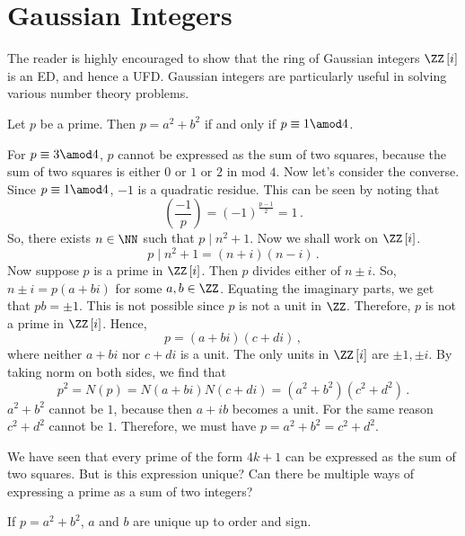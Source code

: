 \documentclass[11pt]{scrartcl}
\begin{document}
\section{Gaussian Integers}
The reader is highly encouraged to show that the ring of Gaussian integers \(\ZZ \left[i\right] \) is an ED, and hence a UFD. Gaussian integers are particularly useful in solving various number theory problems.
\begin{exercise}
Let \(p\) be a prime. Then \(p = a^2+b^2\) if and only if \(p \equiv 1 \amod 4\).
\end{exercise}
\begin{soln}
For \(p\equiv 3 \amod 4\), \(p\) cannot be expressed as the sum of two squares, because the sum of two squares is either \(0\) or \(1\) or \(2\) in mod \(4\). Now let's consider the converse. Since \(p \equiv 1 \amod 4\), \(-1\) is a quadratic residue. This can be seen by noting that
\[ \left(\frac{-1}{p}\right) = \left(-1\right) ^{\frac{p-1}{2}} = 1 \,. \]
So, there exists \(n \in \NN\) such that \(p \mid n^2 +1\). Now we shall work on \(\ZZ \left[i\right] \).
\[ p \mid n^2 + 1 = \left(n+i\right) \left(n-i\right) \,. \]
Now suppose \(p\) is a prime in \(\ZZ \left[i\right] \). Then \(p\) divides either of \(n \pm i\). So, \(n \pm i = p \left(a+bi\right) \) for some \(a,b \in \ZZ\). Equating the imaginary parts, we get that \(pb = \pm 1\). This is not possible since \(p\) is not a unit in \(\ZZ\). Therefore, \(p\) is not a prime in \(\ZZ \left[i\right] \). Hence,
\[ p = \left(a+bi\right) \left(c+di\right) \,, \]
where neither \(a+bi\) nor \(c+di\) is a unit. The only units in \(\ZZ \left[i\right] \) are \(\pm 1, \pm i\). By taking norm on both sides, we find that
\[ p^2 = N \left(p\right) = N\left(a+bi\right) N\left(c+di\right) = \left(a^2+b^2\right) \left(c^2+d^2\right) \,. \]
\(a^2+b^2\) cannot be \(1\), because then \(a+ib\) becomes a unit. For the same reason \(c^2+d^2\) cannot be \(1\). Therefore, we must have \(p = a^2+b^2=c^2+d^2\).
\end{soln}
We have seen that every prime of the form \(4k+1\) can be expressed as the sum of two squares. But is this expression unique? Can there be multiple ways of expressing a prime as a sum of two integers?
\begin{exercise}
If \(p = a^2 + b^2\), \(a\) and \(b\) are unique up to order and sign.
\end{exercise}
\end{document}
